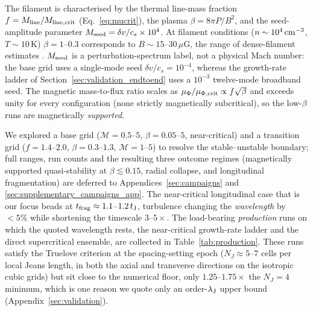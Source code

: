 \documentclass[usenatbib,twoside,twocolumn]{mnras}
\begin{document}
The filament is characterised by the thermal line-mass fraction $f=M_{\rm line}/M_{\rm line,crit}$ (Eq.~\ref{eq:mucrit}), the plasma $\beta=8\pi P/B^2$, and the seed-amplitude parameter $M_{\rm seed}=\delta v/c_s\times10^{4}$. At filament conditions ($n\sim10^4\,{\rm cm^{-3}}$, $T\sim10$\,K) $\beta=1$--$0.3$ corresponds to $B\sim15$--$30\,\mu$G, the range of dense-filament estimates \citep{Crutcher2012}. $M_{\rm seed}$ is a perturbation-spectrum label, not a physical Mach number: the base grid uses a single-mode seed $\delta v/c_s=10^{-4}$, whereas the growth-rate ladder of Section~\ref{sec:validation_endtoend} uses a $10^{-3}$ twelve-mode broadband seed. The magnetic mass-to-flux ratio scales as $\mu_\Phi/\mu_{\Phi,\rm crit}\propto f\sqrt{\beta}$ and exceeds unity for every configuration (none strictly magnetically subcritical), so the low-$\beta$ runs are magnetically \emph{supported}.

We explored a base grid ($\mathcal{M}=0.5$--$5$, $\beta=0.05$--$5$, near-critical) and a transition grid ($f=1.4$--$2.0$, $\beta=0.3$--$1.3$, $\mathcal{M}=1$--$5$) to resolve the stable--unstable boundary; full ranges, run counts and the resulting three outcome regimes (magnetically supported quasi-stability at $\beta\lesssim0.15$, radial collapse, and longitudinal fragmentation) are deferred to Appendices~\ref{sec:campaigns} and \ref{sec:supplementary_campaigns_app}. The near-critical longitudinal case that is our focus beads at $t_{\rm frag}\approx1.1$--$1.2\,t_{\rm J}$, turbulence changing the \emph{wavelength} by $<5\%$ while shortening the timescale $3$--$5\times$. The load-bearing \emph{production} runs on which the quoted wavelength rests, the near-critical growth-rate ladder and the direct supercritical ensemble, are collected in Table~\ref{tab:production}. These runs satisfy the Truelove criterion at the spacing-setting epoch ($N_J\approx5$--$7$ cells per local Jeans length, in both the axial and transverse directions on the isotropic cubic grids) but sit close to the numerical floor, only $1.25$--$1.75\times$ the $N_J=4$ minimum, which is one reason we quote only an order-$\lambda_{\rm J}$ upper bound (Appendix~\ref{sec:validation}).
\end{document}
